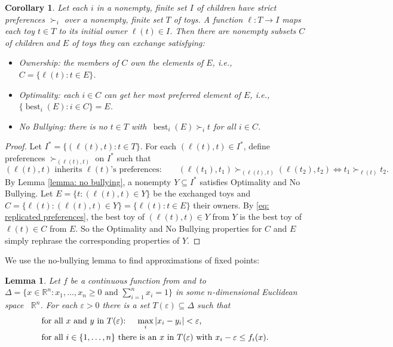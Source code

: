 \documentclass[english, 11pt]{article}
\theoremstyle{plain} %
\newtheorem{lemma}[theorem]{Lemma}
\newtheorem{corollary}[theorem]{Corollary}
\theoremstyle{definition}
\DeclareMathOperator{\best}{best}
\begin{document}
\begin{corollary}\label{cor: no bullying}
Let each $i$ in a nonempty, finite set $I$ of children have strict preferences $\succ_i$ over a nonempty, finite set $T$ of toys. A function $\ell: T \to I$ maps each toy $t \in T$ to its initial owner $\ell(t) \in I$. Then there are nonempty subsets $C$ of children and $E$ of toys they can exchange satisfying:
\begin{itemize}
\item[(a)] Ownership: the members of $C$ own the elements of $E$, i.e., $C = \{\ell(t): t \in E\}$.
\item[(b)] Optimality: each $i \in C$ can get her most preferred element of $E$, i.e., $\{\best_i(E): i \in C\} = E$.
\item[(c)] No Bullying: there is no $t \in T$ with\ $\best_i(E) \succ_i t$ for all $i \in C$.
\end{itemize}
\end{corollary}
\begin{proof}
Let $I^* = \{(\ell(t), t): t \in T\}$. For each $(\ell(t), t) \in I^*$, define preferences $\succ_{(\ell(t), t)}$ on $I^*$ such that
\begin{equation}\label{eq: replicated preferences}
(\ell(t), t) \text{ inherits $\ell(t)$'s preferences:} \qquad (\ell(t_1), t_1) \succ_{(\ell(t), t)} (\ell(t_2), t_2) \iff t_1 \succ_{\ell(t)} t_2.
\end{equation}
By Lemma \ref{lemma: no bullying}, a nonempty $Y \subseteq I^*$ satisfies Optimality and No Bullying. Let $E = \{t: (\ell(t), t) \in Y\}$ be the exchanged toys and $C = \{ \ell(t): (\ell(t), t) \in Y\} = \{\ell(t): t \in E\}$ their owners. By \eqref{eq: replicated preferences}, the best toy of $(\ell(t), t) \in Y$ from $Y$ is the best toy of $\ell(t) \in C$ from $E$. So the Optimality and No Bullying properties for $C$ and $E$ simply rephrase the corresponding properties of $Y$.
\end{proof}

We use the no-bullying lemma to find approximations of fixed points:

\begin{lemma}\label{lemma: AFP}
Let $f$ be a continuous function from and to $\Delta = \{x \in \mathbb{R}^n: x_1, \ldots, x_n \geq 0 \text{ and } \sum_{i=1}^n x_i = 1\}$ in some $n$-dimensional Euclidean space \, $\mathbb{R}^n$. For each $\varepsilon > 0$ there is a set $T(\varepsilon) \subseteq \Delta$ such that
\begin{align}
&\text{for all $x$ and $y$ in $T(\varepsilon)$: \quad $\max_i \, \lvert x_i - y_i \rvert < \varepsilon$,} \label{eq: nearby} \\
&\text{for all $i \in \{1, \ldots, n\}$ there is an $x$ in $T(\varepsilon)$ with $x_i - \varepsilon \leq f_i(x)$.} \label{eq: AFP}
\end{align}
\end{lemma}
\end{document}
